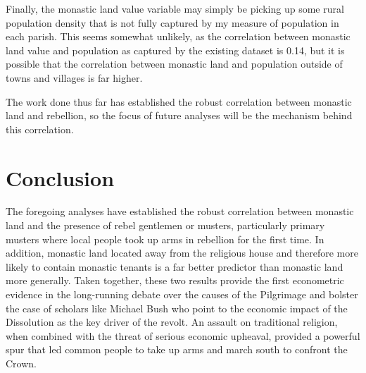 \documentclass[12pt]{article}
\begin{document}
Finally, the monastic land value variable may simply be picking up some rural population density that is not fully captured by my measure of population in each parish. This seems somewhat unlikely, as the correlation between monastic land value and population as captured by the existing dataset is 0.14, but it is possible that the correlation between monastic land and population outside of towns and villages is far higher.

The work done thus far has established the robust correlation between monastic land and rebellion, so the focus of future analyses will be the mechanism behind this correlation.


\section{Conclusion}

The foregoing analyses have established the robust correlation between monastic land and the presence of rebel gentlemen or musters, particularly primary musters where local people took up arms in rebellion for the first time. In addition, monastic land located away from the religious house and therefore more likely to contain monastic tenants is a far better predictor than monastic land more generally. Taken together, these two results provide the first econometric evidence in the long-running debate over the causes of the Pilgrimage and bolster the case of scholars like Michael Bush who point to the economic impact of the Dissolution as the key driver of the revolt. An assault on traditional religion, when combined with the threat of serious economic upheaval, provided a powerful spur that led common people to take up arms and march south to confront the Crown.

\clearpage
\singlespacing

\printbibliography
\end{document}
